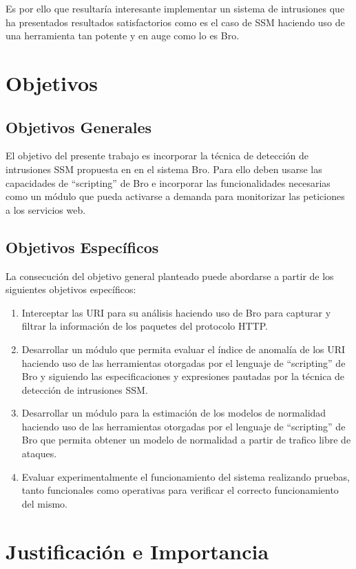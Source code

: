 Es por ello que resultaría interesante implementar un sistema de intrusiones que ha presentados resultados satisfactorios como es el caso de SSM haciendo uso de una herramienta tan potente y en auge como lo es Bro.

\section{Objetivos}
\subsection{Objetivos Generales}
El objetivo del presente trabajo es incorporar la técnica de detección de intrusiones SSM propuesta en \cite{ssm} en el sistema Bro. Para ello deben usarse las capacidades de ``scripting'' de Bro e incorporar las funcionalidades necesarias como un módulo que pueda activarse a demanda para monitorizar las peticiones a los servicios web.
\subsection{Objetivos Específicos}
La consecución del objetivo general planteado puede abordarse a partir de los siguientes objetivos específicos:

\begin{enumerate}
\item Interceptar las URI para su análisis haciendo uso de Bro para capturar y filtrar la información de los paquetes del protocolo HTTP.
\item Desarrollar un módulo que permita evaluar el índice de anomalía de los URI haciendo uso de las herramientas otorgadas por el lenguaje de ``scripting'' de Bro y siguiendo las especificaciones y expresiones pautadas por la técnica de detección de intrusiones SSM. 
\item Desarrollar un módulo para la estimación de los modelos de normalidad haciendo uso de las herramientas otorgadas por el lenguaje de ``scripting'' de Bro que permita obtener un modelo de normalidad a partir de trafico libre de ataques.
\item Evaluar experimentalmente el funcionamiento del sistema realizando pruebas, tanto funcionales como operativas para verificar el correcto funcionamiento del mismo.
\end{enumerate}

\section{Justificación e Importancia}


